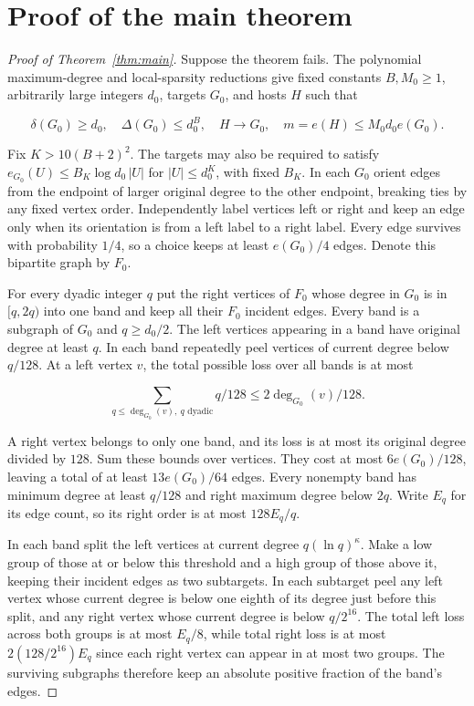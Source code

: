 \documentclass[11pt]{amsart}
\theoremstyle{definition}
\theoremstyle{remark}
\numberwithin{equation}{section}
\begin{document}
\section{Proof of the main theorem}\label{sec:assembly}

\begin{proof}[Proof of Theorem~\ref{thm:main}]

Suppose the theorem fails. The polynomial maximum-degree and local-sparsity reductions give fixed constants $B,M_0\ge1$, arbitrarily large integers $ d_0$, targets $ G_0$, and hosts $ H$ such that

\begin{equation}
\delta(G_0)\ge d_0,\quad \Delta(G_0)\le d_0^B,\quad
H\to G_0,\quad m=e(H)\le M_0d_0e(G_0).
\end{equation}

Fix $K>10(B+2)^2$. The targets may also be required to satisfy $ e_{G_0}(U)\le B_K\log d_0\,|U|$ for $|U|\le d_0^K $, with fixed $ B_K $. In each $ G_0$ orient edges from the endpoint of larger original degree to the other endpoint, breaking ties by any fixed vertex order. Independently label vertices left or right and keep an edge only when its orientation is from a left label to a right label. Every edge survives with probability $1/4$, so a choice keeps at least $ e(G_0)/4$ edges. Denote this bipartite graph by $ F_0$.

For every dyadic integer $q $ put the right vertices of $ F_0$ whose degree in $ G_0$ is in $[q,2q)$ into one band and keep all their $ F_0$ incident edges. Every band is a subgraph of $ G_0$ and $ q\ge d_0/2$. The left vertices appearing in a band have original degree at least $ q $. In each band repeatedly peel vertices of current degree below $ q/128$. At a left vertex $ v$, the total possible loss over all bands is at most

\begin{equation}
\sum_{q\le\deg_{G_0}(v),\ q\text{ dyadic}} q/128\le 2\deg_{G_0}(v)/128.
\end{equation}

A right vertex belongs to only one band, and its loss is at most its original degree divided by $128$. Sum these bounds over vertices. They cost at most $6e(G_0)/128$, leaving a total of at least $13e(G_0)/64$ edges. Every nonempty band has minimum degree at least $ q/128$ and right maximum degree below $2q $. Write $ E_q $ for its edge count, so its right order is at most $128E_q/q$.

In each band split the left vertices at current degree $q(\ln q)^\kappa $. Make a low group of those at or below this threshold and a high group of those above it, keeping their incident edges as two subtargets. In each subtarget peel any left vertex whose current degree is below one eighth of its degree just before this split, and any right vertex whose current degree is below $ q/2^{16}$. The total left loss across both groups is at most $ E_q/8$, while total right loss is at most $2(128/2^{16})E_q$ since each right vertex can appear in at most two groups. The surviving subgraphs therefore keep an absolute positive fraction of the band's edges.


\end{proof}
\end{document}
